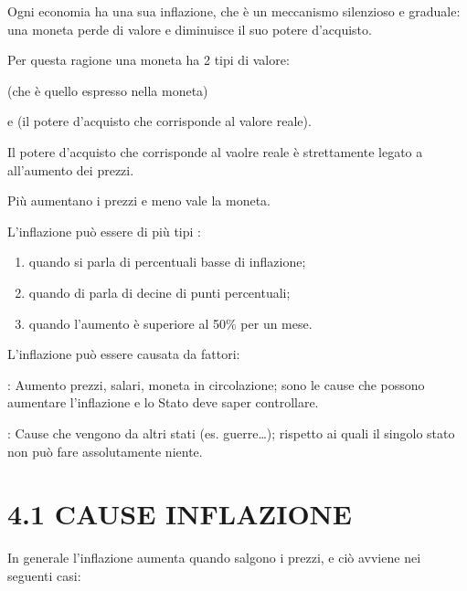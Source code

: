 \documentclass[letterpaper,10pt,italian]{sphinxmanual}
\begin{document}
\sphinxAtStartPar
Ogni economia ha una sua inflazione, che è un meccanismo silenzioso e graduale:
una moneta perde di valore e diminuisce il suo potere d’acquisto.

\sphinxAtStartPar
Per questa ragione una moneta ha 2 tipi di valore:

\sphinxAtStartPar
{} (che è quello espresso nella moneta)

\sphinxAtStartPar
e  (il potere d’acquisto che corrisponde al valore reale).

\sphinxAtStartPar
Il potere d’acquisto che corrisponde al vaolre reale è strettamente legato a all’aumento dei prezzi.

\sphinxAtStartPar
Più aumentano i prezzi e meno vale la moneta.

\sphinxAtStartPar
L’inflazione può essere di più tipi :
\begin{enumerate}
%
\item {} 
\sphinxAtStartPar
{} quando si parla di percentuali basse di inflazione;

\item {} 
\sphinxAtStartPar
{} quando di parla di decine di punti percentuali;

\item {} 
\sphinxAtStartPar
{} quando l’aumento è superiore al 50\% per un mese.

\end{enumerate}

\sphinxAtStartPar
L’inflazione può essere causata da fattori:

\sphinxAtStartPar
{}: Aumento prezzi, salari, moneta in circolazione; sono le cause che possono aumentare
l’inflazione e lo Stato deve saper controllare.

\sphinxAtStartPar
{}: Cause che vengono da altri stati (es. guerre…); rispetto ai quali il singolo
stato non può fare assolutamente niente.


\section{4.1 \sphinxhyphen{} CAUSE INFLAZIONE}
\label{\detokenize{4.L'INFLAZIONE:cause-inflazione}}
\sphinxAtStartPar
In generale l’inflazione aumenta quando salgono i prezzi, e ciò avviene nei seguenti casi:
\end{document}
